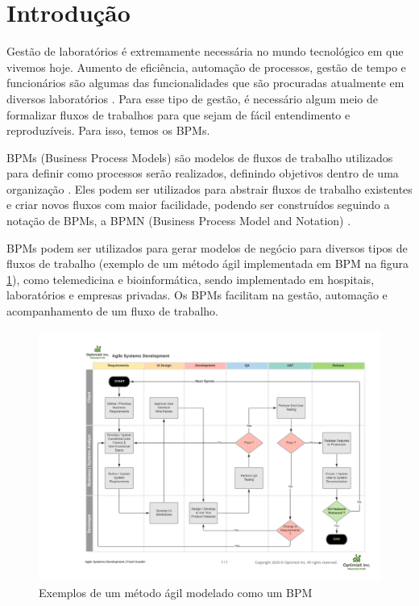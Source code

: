 \section{Introdução} \label{introduction}


Gestão de laboratórios é extremamente necessária no mundo tecnológico em que vivemos hoje. Aumento de eficiência, automação de processos, gestão de tempo e funcionários são algumas das funcionalidades que são procuradas atualmente em diversos laboratórios \cite{sun2021laboratory}. Para esse tipo de gestão, é necessário algum meio de formalizar fluxos de trabalhos para que sejam de fácil entendimento e reproduzíveis. Para isso, temos os BPMs.

BPMs (Business Process Models) são modelos de fluxos de trabalho utilizados para definir como processos serão realizados, definindo objetivos dentro de uma organização \cite{Alves2014}. Eles podem ser utilizados para abstrair fluxos de trabalho existentes e criar novos fluxos com maior facilidade, podendo ser construídos seguindo a notação de BPMs, a BPMN (Business Process Model and Notation) \cite{Dijkman2008}.

BPMs podem ser utilizados para gerar modelos de negócio para diversos tipos de fluxos de trabalho (exemplo de um método ágil implementada em BPM na figura \ref{fig:bpm}), como telemedicina e bioinformática, sendo implementado em hospitais, laboratórios e empresas privadas. Os BPMs facilitam na gestão, automação e acompanhamento de um fluxo de trabalho.

\begin{figure}
    \centering
    \includegraphics[width=1\textwidth]{imgs/BPM/sprint as bpm.png}
    \caption{Exemplos de um método ágil modelado como um BPM}
    \label{fig:bpm}
\end{figure}

